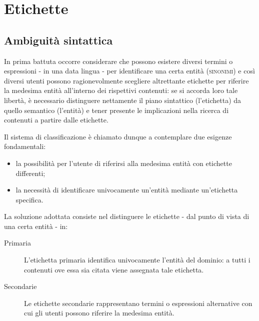 \documentclass[10pt,a4paper,headinclude,footinclude,hidelinks]{scrreprt} %
\begin{document}
	\section{Etichette}
	\label{sec:stage:design:etichette}

	\subsection{Ambiguità sintattica}
	In prima battuta occorre considerare che possono esistere diversi termini o espressioni - in una data lingua - per identificare una certa entità (\textsc{sinonimi}) e così diversi utenti possono ragionevolmente scegliere altrettante etichette per riferire la medesima entità all'interno dei rispettivi contenuti: se si accorda loro tale libertà, è necessario distinguere nettamente il piano sintattico (l'etichetta) da quello semantico (l'entità) e tener presente le implicazioni nella ricerca di contenuti a partire dalle etichette.

	Il sistema di classificazione è chiamato dunque a contemplare due esigenze fondamentali:
	\begin{itemize}
	\item la possibilità per l'utente di riferirsi alla medesima entità con etichette differenti;
	\item la necessità di identificare univocamente un'entità mediante un'etichetta specifica.
	\end{itemize}

	La soluzione adottata consiste nel distinguere le etichette - dal punto di vista di una certa entità - in:
	\begin{description}
	\item[Primaria] L'etichetta primaria identifica univocamente l'entità del dominio: a tutti i contenuti ove essa sia citata viene assegnata tale etichetta.
	\item[Secondarie] Le etichette secondarie rappresentano termini o espressioni alternative con cui gli utenti possono riferire la medesima entità.
	\end{description}

\end{document}

